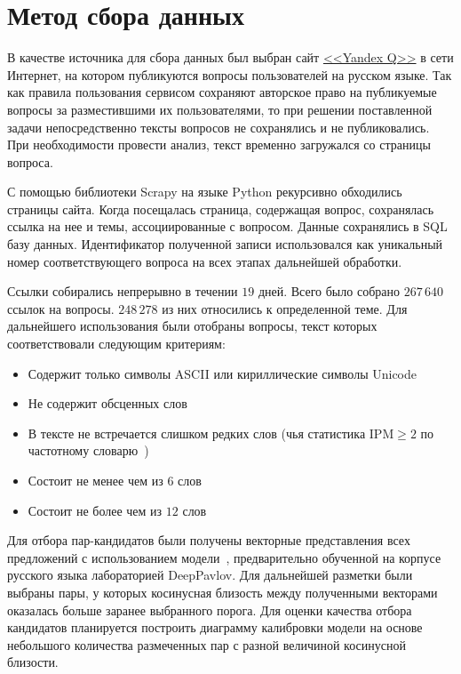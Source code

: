 \documentclass[a4paper,14pt]{extarticle}
\begin{document}
\section{Метод сбора данных}

В качестве источника для сбора данных был выбран сайт \href{https://yandex.ru/q/}{<<Yandex Q>>} в сети Интернет, на котором публикуются вопросы пользователей на русском языке.
Так как правила пользования сервисом сохраняют авторское право на публикуемые вопросы за разместившими их пользователями, то при решении поставленной задачи непосредственно тексты вопросов не сохранялись и не публиковались. При необходимости провести анализ, текст временно загружался со страницы вопроса.

С помощью библиотеки Scrapy на языке Python рекурсивно обходились страницы сайта. Когда посещалась страница, содержащая вопрос, сохранялась ссылка на нее и темы, ассоциированные с вопросом.
Данные сохранялись в SQL базу данных. Идентификатор полученной записи использовался как уникальный номер соответствующего вопроса на всех этапах дальнейшей обработки.

Ссылки собирались непрерывно в течении $19$ дней. Всего было собрано $267\,640$ ссылок на вопросы. $248\,278$ из них относились к определенной теме.
Для дальнейшего использования были отобраны вопросы, текст которых соответствовали следующим критериям:
\begin{itemize}
    \item Содержит только символы ASCII или кириллические символы Unicode
    \item Не содержит обсценных слов
    \item В тексте не встречается слишком редких слов (чья статистика ${\mathrm{IPM} \ge 2}$ по частотному словарю~\autocite{ляшевская2009частотный})
    \item Состоит не менее чем из $6$ слов
    \item Состоит не более чем из $12$ слов
\end{itemize}

Для отбора пар-кандидатов были получены векторные представления всех предложений с использованием модели~\autocite{reimers2019sentence}, предварительно обученной на корпусе русского языка лабораторией DeepPavlov.
Для дальнейшей разметки были выбраны пары, у которых косинусная близость между полученными векторами оказалась больше заранее выбранного порога.
Для оценки качества отбора кандидатов планируется построить диаграмму калибровки модели на основе небольшого количества размеченных пар с разной величиной косинусной близости.
\end{document}
